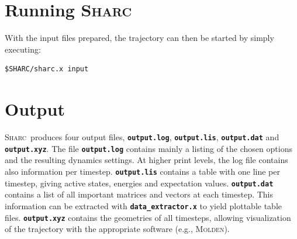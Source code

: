 \documentclass[a4paper,11pt,DIV=15,openany]{scrbook}
\newcommand{\sharc}{\textsc{Sharc}}
\newcommand{\ttt}[1]{\textbf{\texttt{#1}}}
\newenvironment{example}{
  \vspace{0mm}
  \definecolor{shadecolor}{HTML}{E4F4FF}
  \begin{shaded}
}{
  \end{shaded}
}
\begin{document}
\section{Running \sharc}

With the input files prepared, the trajectory can then be started by simply executing:
\begin{example}\vspace{-8mm}
\begin{verbatim}
$SHARC/sharc.x input 
\end{verbatim}\vspace{-5mm}
\end{example}

\section{Output}

\sharc\ produces four output files, \ttt{output.log}, \ttt{output.lis}, \ttt{output.dat} and \ttt{output.xyz}. 
The file \ttt{output.log} contains mainly a listing of the chosen options and the resulting dynamics settings. 
At higher print levels, the log file contains also information per timestep. 
\ttt{output.lis} contains a table with one line per timestep, giving active states, energies and expectation values.
\ttt{output.dat} contains a list of all important matrices and vectors at each timestep. 
This information can be extracted with \ttt{data\_extractor.x} to yield plottable table files. 
\ttt{output.xyz} contains the geometries of all timesteps, allowing visualization of the trajectory with the appropriate software (e.g., \textsc{Molden}).
\end{document}
